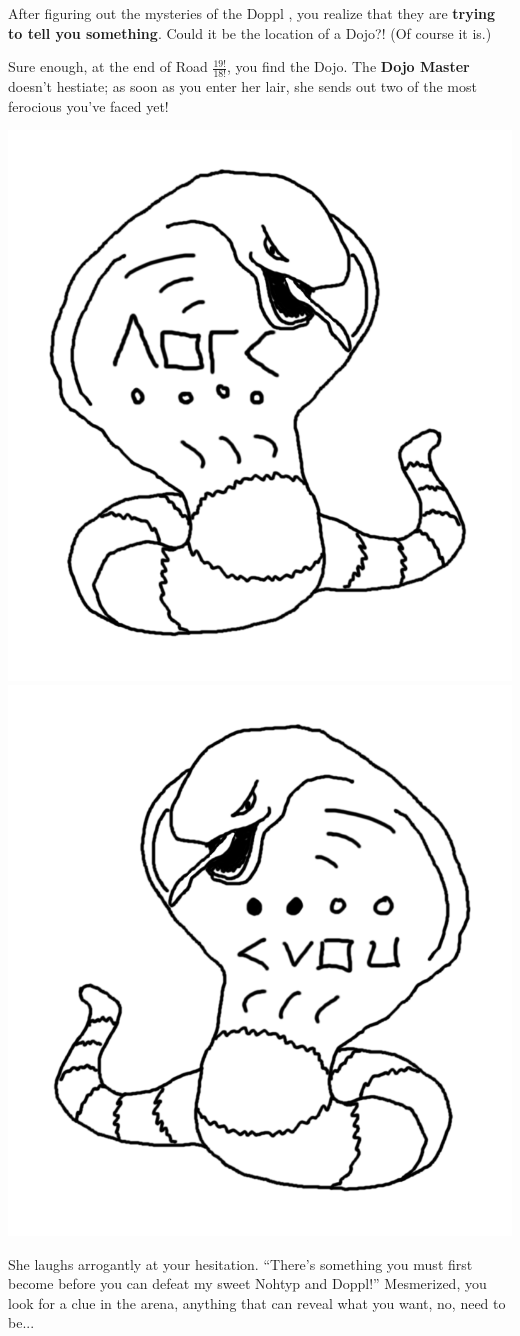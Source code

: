 

After figuring out the mysteries of the Doppl \mappMobimon{}, you realize
that they are \textbf{trying to tell you something}. Could it be the location of
a \mappMobimon{} Dojo?! (Of course it is.)

Sure enough, at the end of Road \(\frac{19!}{18!}\), you find the Dojo.
The \textbf{Dojo Master} doesn't hestiate; as soon as you enter her lair,
she sends out two of the most ferocious \mappMobimon{} you've faced yet!

\begin{center}
\includegraphics[width=0.4\linewidth]{assets/not-arbok-1.png}
\includegraphics[width=0.4\linewidth]{assets/not-arbok-2.png}
\end{center}

She laughs arrogantly at your hesitation.
``There's something you must first become before you can defeat
my sweet Nohtyp and Doppl!'' Mesmerized, you look for a clue in the arena,
anything that can reveal what you want, no, need to be...


